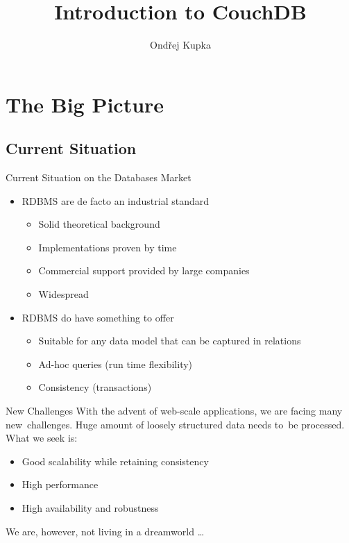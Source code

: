 \documentclass{beamer}
\title{Introduction to CouchDB}
\author{Ondřej Kupka}
\begin{document}
\begin{frame}
\titlepage
\end{frame}

\section{The Big Picture}
\subsection{Current Situation}
\begin{frame}{Current Situation on the Databases Market}
  \begin{itemize}
    \item RDBMS are de facto an industrial standard
    \begin{itemize}
      \item Solid theoretical background
      \item Implementations proven by time
      \item Commercial support provided by large companies
      \item Widespread
    \end{itemize}
    \item RDBMS do have something to offer
    \begin{itemize}
      \item Suitable for any data model that can be captured in relations
      \item Ad-hoc queries (run time flexibility)
      \item Consistency (transactions)
    \end{itemize}
  \end{itemize}
\end{frame}

\begin{frame}{New Challenges}
  With the advent of web-scale applications, we are facing many new~challenges.
  Huge amount of loosely structured data needs to~be processed.
  What we seek is:
  \begin{itemize}
    \item Good scalability while retaining consistency
    \item High performance
    \item High availability and robustness
  \end{itemize}
  We are, however, not living in a dreamworld \ldots
\end{frame}
\end{document}
